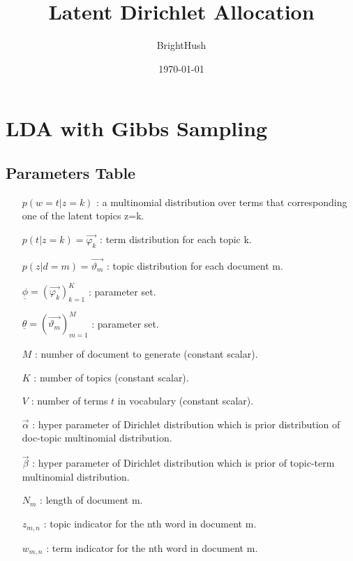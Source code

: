 \documentclass[UTF8]{ctexart}
\title{Latent Dirichlet Allocation}
\author{BrightHush}
\date{\today}
\begin{document}
\maketitle
\tableofcontents

\pagestyle{fancy}
\cfoot{\thepage}

\newcommand{\figref}[1]{\figurename~\ref{#1}}

\section{LDA with Gibbs Sampling}

\subsection{Parameters Table}
\begin{itemize}
\item[$p(w=t|z=k)$]: a multinomial distribution over terms that corresponding 
one of the latent topics z=k.
\item[$p(t|z=k)=\vec{\varphi_k}$]: term distribution for each topic k.
\item[$p(z|d=m)=\vec{\vartheta_m}$]: topic distribution for each document m.
\item[$\underline{\phi}=\left( \vec{\varphi_k} \right) _{k=1}^K$]: parameter set.
\item[$\underline{\theta}=\left( \vec{\vartheta_m}\right)_{m=1}^M$]: parameter set.
\item[$M$]: number of document to generate (constant scalar).
\item[$K$]: number of topics (constant scalar).
\item[$V$]: number of terms $t$ in vocabulary (constant scalar).
\item[$\vec{\alpha}$]: hyper parameter of Dirichlet distribution which is prior distribution of
 doc-topic multinomial distribution.
\item[$\vec{\beta}$]: hyper parameter of Dirichlet distribution which is prior of topic-term 
multinomial distribution.
\item[$N_m$]: length of document m.
\item[$z_{m,n}$]: topic indicator for the nth word in document m.
\item[$w_{m,n}$]: term indicator for the nth word in document m.
\end{itemize}
\end{document}
